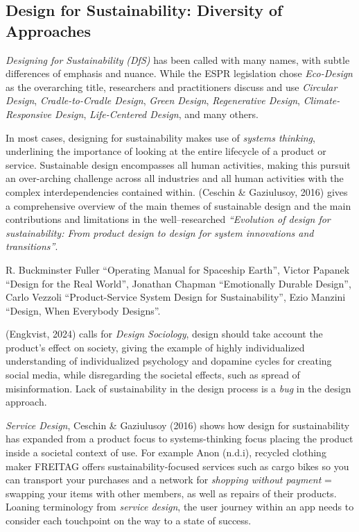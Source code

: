 \documentclass[
  letterpaper,
  DIV=11,
  numbers=noendperiod]{scrartcl}
\begin{document}
\subsection{Design for Sustainability: Diversity of
Approaches}\label{design-for-sustainability-diversity-of-approaches}

\emph{Designing for Sustainability} \emph{(DfS)} has been called with
many names, with subtle differences of emphasis and nuance. While the
ESPR legislation chose \emph{Eco-Design} as the overarching title,
researchers and practitioners discuss and use \emph{Circular Design},
\emph{Cradle-to-Cradle Design}, \emph{Green Design}, \emph{Regenerative
Design}, \emph{Climate-Responsive Design}, \emph{Life-Centered Design},
and many others.

In most cases, designing for sustainability makes use of \emph{systems
thinking}, underlining the importance of looking at the entire lifecycle
of a product or service. Sustainable design encompasses all human
activities, making this pursuit an over-arching challenge across all
industries and all human activities with the complex interdependencies
contained within. (Ceschin \& Gaziulusoy, 2016) gives a comprehensive
overview of the main themes of sustainable design and the main
contributions and limitations in the well--researched \emph{``Evolution
of design for sustainability: From product design to design for system
innovations and transitions''}.

R. Buckminster Fuller ``Operating Manual for Spaceship Earth'', Victor
Papanek ``Design for the Real World'', Jonathan Chapman ``Emotionally
Durable Design'', Carlo Vezzoli ``Product-Service System Design for
Sustainability'', Ezio Manzini ``Design, When Everybody Designs''.

(Engkvist, 2024) calls for \emph{Design Sociology}, design should take
account the product's effect on society, giving the example of highly
individualized understanding of individualized psychology and dopamine
cycles for creating social media, while disregarding the societal
effects, such as spread of misinformation. Lack of sustainability in the
design process is a \emph{bug} in the design approach.

\emph{Service Design}, Ceschin \& Gaziulusoy (2016) shows how design for
sustainability has expanded from a product focus to systems-thinking
focus placing the product inside a societal context of use. For example
Anon (n.d.i), recycled clothing maker FREITAG offers
sustainability-focused services such as cargo bikes so you can transport
your purchases and a network for \emph{shopping without payment} =
swapping your items with other members, as well as repairs of their
products. Loaning terminology from \emph{service design}, the user
journey within an app needs to consider each touchpoint on the way to a
state of success.
\end{document}
